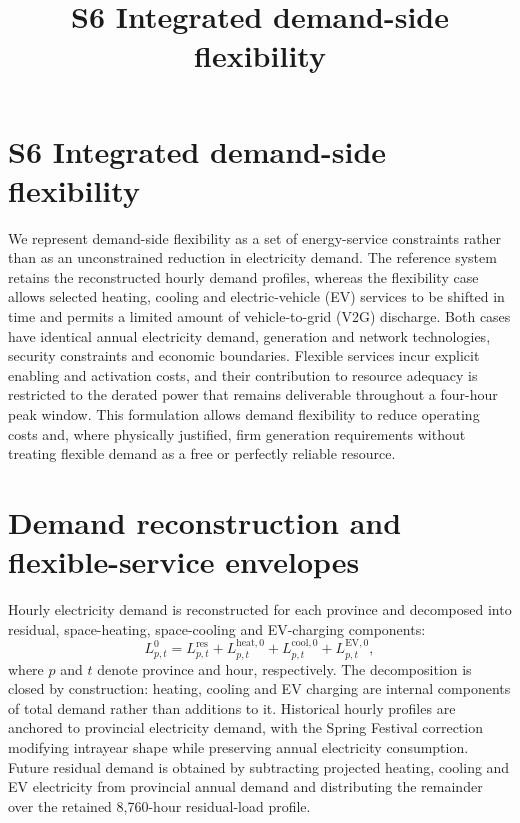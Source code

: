 \documentclass[12pt]{article}
\title{\textbf{S6 Integrated demand-side flexibility}}
\author{}
\date{}
\begin{document}
\section*{S6 Integrated demand-side flexibility}

We represent demand-side flexibility as a set of energy-service constraints
rather than as an unconstrained reduction in electricity demand. The
reference system retains the reconstructed hourly demand profiles, whereas
the flexibility case allows selected heating, cooling and electric-vehicle
(EV) services to be shifted in time and permits a limited amount of
vehicle-to-grid (V2G) discharge. Both cases have identical annual electricity
demand, generation and network technologies, security constraints and
economic boundaries. Flexible services incur explicit enabling and
activation costs, and their contribution to resource adequacy is restricted
to the derated power that remains deliverable throughout a four-hour peak
window. This formulation allows demand flexibility to reduce operating costs
and, where physically justified, firm generation requirements without
treating flexible demand as a free or perfectly reliable resource.

\section{Demand reconstruction and flexible-service envelopes}

Hourly electricity demand is reconstructed for each province and decomposed
into residual, space-heating, space-cooling and EV-charging components:
\begin{equation}
  L^{0}_{p,t}
  =
  L^{\mathrm{res}}_{p,t}
  +L^{\mathrm{heat},0}_{p,t}
  +L^{\mathrm{cool},0}_{p,t}
  +L^{\mathrm{EV},0}_{p,t},
  \label{eq:loaddecomposition}
\end{equation}
where $p$ and $t$ denote province and hour, respectively. The decomposition is
closed by construction: heating, cooling and EV charging are internal
components of total demand rather than additions to it. Historical hourly
profiles are anchored to provincial electricity demand, with the Spring
Festival correction modifying intrayear shape while preserving annual
electricity consumption. Future residual demand is obtained by subtracting
projected heating, cooling and EV electricity from provincial annual demand
and distributing the remainder over the retained 8,760-hour residual-load
profile.
\end{document}
